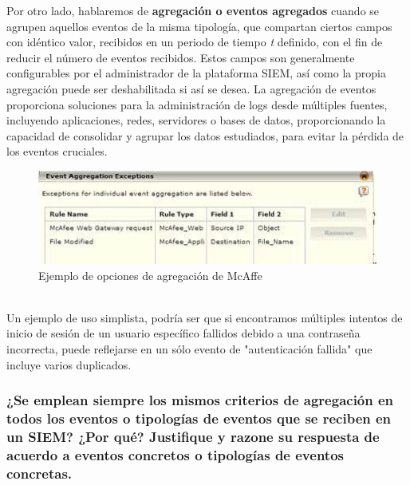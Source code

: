 \documentclass[12pt,twoside]{article}
\begin{document}
Por otro lado, hablaremos de \textbf{agregación o eventos agregados} cuando se agrupen aquellos eventos de la misma tipología, que compartan ciertos campos con idéntico valor, recibidos en un periodo de tiempo \textit{t} definido, con el fin de reducir el número de eventos recibidos. Estos campos son generalmente configurables por el administrador de la plataforma SIEM, así como la propia agregación puede ser deshabilitada si así se desea. La agregación de eventos proporciona soluciones para la administración de logs desde múltiples fuentes, incluyendo aplicaciones, redes, servidores o bases de datos, proporcionando la capacidad de consolidar y agrupar los datos estudiados, para evitar la pérdida de los eventos cruciales. \\ 
\begin{figure}[h]
    \centering
    \includegraphics[scale=0.7]{./imagenes/descarga}
    \caption{Ejemplo de opciones de agregación de McAffe}
\end{figure}\\
Un ejemplo de uso simplista, podría ser que si encontramos múltiples intentos de inicio de sesión de un usuario específico fallidos debido a una contraseña incorrecta,  puede reflejarse en un sólo evento de "autenticación fallida" que incluye varios duplicados.





\subsubsection*{¿Se emplean siempre los mismos criterios de agregación en todos los eventos o tipologías de eventos que se reciben en un SIEM? ¿Por qué? Justifique y razone su respuesta de acuerdo a eventos concretos o tipologías de eventos concretas.}
\end{document}
